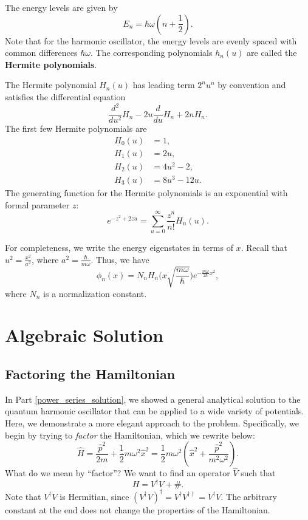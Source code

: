 The energy levels are given by $$\boxed{E_n=\hbar\omega(n+\frac{1}{2}).}$$Note that for the harmonic oscillator, the energy levels are evenly spaced with common differences $\hbar\omega$. The corresponding polynomials $h_n(u)$ are called the \textbf{Hermite polynomials}. 

\begin{frameddefn}
    The Hermite polynomial $H_n(u)$ has leading term $2^nu^n$ by convention and satisfies the differential equation $$\frac{d^2}{du^2}H_n-2u\frac{d}{du}H_n+2nH_n.$$The first few Hermite polynomials are \begin{align*}H_0(u)&=1,\\H_1(u)&=2u,\\H_2(u)&=4u^2-2,\\H_3(u)&=8u^3-12u.\end{align*}The generating function for the Hermite polynomials is an exponential with formal parameter $z$: $$e^{-z^2+2zu}=\sum_{u=0}^\infty\frac{z^n}{n!}H_n(u).$$
\end{frameddefn}

For completeness, we write the energy eigenstates in terms of $x$. Recall that $u^2=\frac{x^2}{a^2}$, where $a^2=\frac{\hbar}{m\omega}$. Thus, we have $$\boxed{\phi_n(x)=N_nH_n\bigg(x\sqrt{\frac{m\omega}{\hbar}}\bigg)e^{-\frac{m\omega}{2\hbar}x^2},}$$where $N_n$ is a normalization constant.

\section{Algebraic Solution}\label{algebraic_solution}
\subsection{Factoring the Hamiltonian}\label{factoring_hamiltonian}

In Part \ref{power_series_solution}, we showed a general analytical solution to the quantum harmonic oscillator that can be applied to a wide variety of potentials. Here, we demonstrate a more elegant approach to the problem. Specifically, we begin by trying to \textit{factor} the Hamiltonian, which we rewrite below: $$\hat{H}=\frac{\hat{p}^2}{2m}+\frac{1}{2}m\omega^2\hat{x}^2=\frac{1}{2}m\omega^2(\hat{x}^2+\frac{\hat{p}^2}{m^2\omega^2}).$$What do we mean by ``factor''? We want to find an operator $\hat{V}$ such that $$H=V^\dagger V+\#.$$Note that $V^\dagger V$ is Hermitian, since $(V^\dagger V)^\dagger=V^\dagger V^{\dagger\dagger}=V^\dagger V$.  The arbitrary constant at the end does not change the properties of the Hamiltonian.

